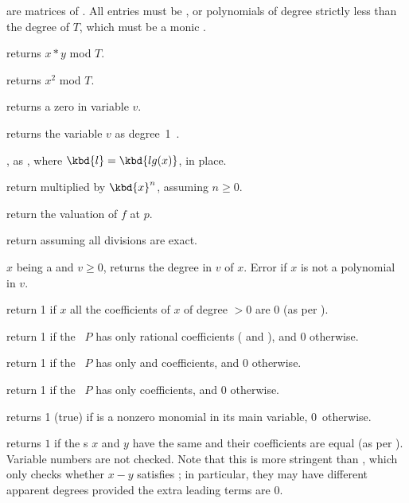 
 are matrices of . All entries must be ,  or
polynomials of degree strictly less than the degree of $T$, which must be a monic
.

 returns $x*y$ mod $T$.

 returns $x^2$ mod $T$.


 returns a zero  in variable $v$.

 returns the variable $v$ as degree~1~.

, as , where
$\kbd{l} = \kbd{lg(x)}$, in place.

 return 
multiplied by $\kbd{x}^n$, assuming $n\geq 0$.

 return the valuation of $f$ at $p$.

 return  assuming all divisions
are exact.



 $x$ being a  and $v \geq 0$,
returns the degree in $v$ of $x$. Error if $x$ is not a polynomial in $v$.

 return 1 if $x$ all the coefficients of
$x$ of degree $> 0$ are $0$ (as per ).

 return 1 if the ~$P$ has only
rational coefficients ( and ), and 0 otherwise.

 return 1 if the ~$P$ has only
 and  coefficients, and 0 otherwise.

 return 1 if the ~$P$ has only
 coefficients, and 0 otherwise.

 returns 1 (true) if  is a nonzero
monomial in its main variable, 0~otherwise.

 returns $1$ if the s $x$ and $y$
have the same  and their coefficients are equal (as per
). Variable numbers are not checked. Note that this is more
stringent than , which only checks whether $x - y$ satisfies
; in particular, they may have different apparent degrees provided
the extra leading terms are $0$.

